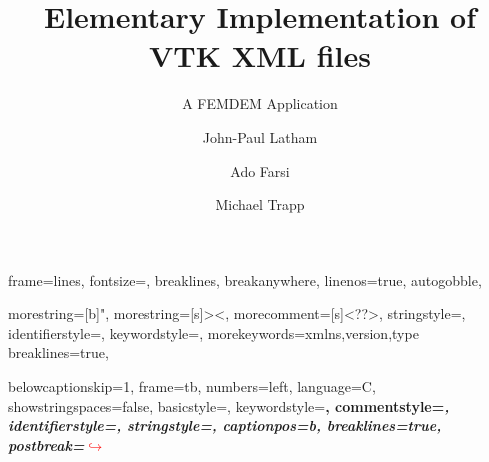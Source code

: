 

\setminted
{
frame=lines,
fontsize=\footnotesize,
breaklines,
breakanywhere,
linenos=true,
autogobble,
}

\newenvironment{longlisting}{\captionsetup{type=listing}}{}

\usepackage{listings}


{
  morestring=[b]",
  morestring=[s]{>}{<},
  morecomment=[s]{<?}{?>},
  stringstyle=\color{black},
  identifierstyle=\color{darkblue},
  keywordstyle=\color{cyan},
  morekeywords={xmlns,version,type}%
  breaklines=true,
}

 {
  belowcaptionskip=1\baselineskip,
  frame=tb,
  numbers=left,
  language=C,
  showstringspaces=false,
  basicstyle=\footnotesize\ttfamily,
  keywordstyle=\bfseries\color{green!40!black},
  commentstyle=\itshape\color{purple!40!black},
  identifierstyle=\color{blue},
  stringstyle=\color{orange},
  captionpos=b,
  breaklines=true, postbreak=\mbox{\textcolor{red}{$\hookrightarrow$}\space}
}

\captionsetup[lstlisting]{labelsep=space,justification=raggedright,singlelinecheck=off}

\usepackage{tcolorbox}
\lstset{escapechar=£,style=C,linewidth=0.9\columnwidth, float=*h,columns=fullflexible,}

\usepackage{xr-hyper}
\makeatletter
\newcommand*{\addFileDependency}[1]{%
  \typeout{(#1)}
  \@addtofilelist{#1}
  \IfFileExists{#1}{}{\typeout{No file #1.}}
}
\makeatother
 
\newcommand*{\myext}[1]{%
    \addFileDependency{#1.tex}%
    \addFileDependency{#1.aux}%
}

\title[Elementary Implementation of VTK files in C]{Elementary Implementation of VTK XML files}
\subtitle{A FEMDEM Application}

\author{John-Paul Latham}

\author{Ado Farsi}
\authornotemark[1]
\authornotemark[2]

\author{Michael Trapp}
\authornotemark[1]

\renewcommand{\shortauthors}{Latham et. al.}
